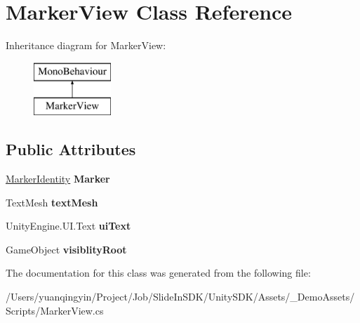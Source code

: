 \hypertarget{class_marker_view}{}\section{Marker\+View Class Reference}
\label{class_marker_view}
Inheritance diagram for Marker\+View\+:\begin{figure}[H]
\begin{center}
\leavevmode
\includegraphics[height=2.000000cm]{class_marker_view}
\end{center}
\end{figure}
\subsection*{Public Attributes}
\begin{DoxyCompactItemize}
\item 
\mbox{\label{class_marker_view_a620c16ac106f225cbbc30fe9c919ac07}} 
\mbox{\hyperlink{class_ximmerse_1_1_slide_in_s_d_k_1_1_marker_identity}{Marker\+Identity}} {\bfseries Marker}
\item 
\mbox{\label{class_marker_view_a68c775d2fc149479b7f13f45b34b74f1}} 
Text\+Mesh {\bfseries text\+Mesh}
\item 
\mbox{\label{class_marker_view_a0fabc63f86ebb4cb489a15df4ce1c18d}} 
Unity\+Engine.\+U\+I.\+Text {\bfseries ui\+Text}
\item 
\mbox{\label{class_marker_view_af24407582da37d7b61fe52eacd647914}} 
Game\+Object {\bfseries visiblity\+Root}
\end{DoxyCompactItemize}


The documentation for this class was generated from the following file\+:\begin{DoxyCompactItemize}
\item 
/\+Users/yuanqingyin/\+Project/\+Job/\+Slide\+In\+S\+D\+K/\+Unity\+S\+D\+K/\+Assets/\+\_\+\+Demo\+Assets/\+Scripts/Marker\+View.\+cs\end{DoxyCompactItemize}
